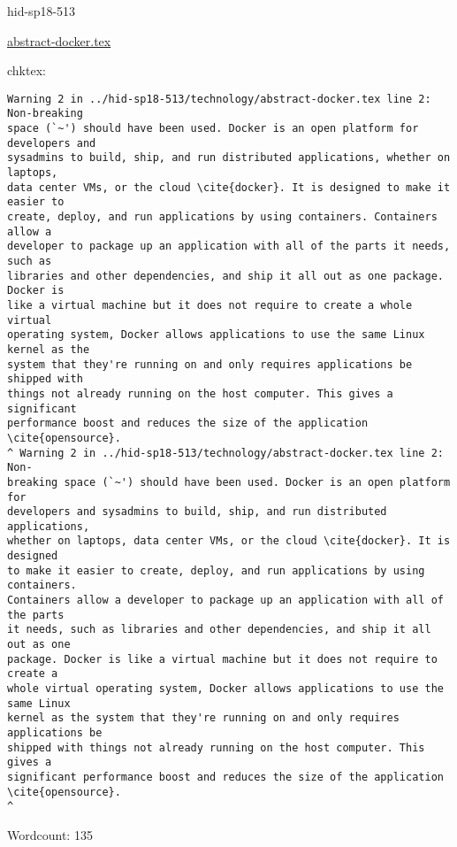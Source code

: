 

\begin{IU}

hid-sp18-513

\href{https://github.com/cloudmesh-community/hid-sp18-513/blob/master//technology/abstract-docker.tex}{abstract-docker.tex}

 
chktex:
\begin{tiny}
\begin{verbatim}
Warning 2 in ../hid-sp18-513/technology/abstract-docker.tex line 2: Non-breaking
space (`~') should have been used. Docker is an open platform for developers and
sysadmins to build, ship, and run distributed applications, whether on laptops,
data center VMs, or the cloud \cite{docker}. It is designed to make it easier to
create, deploy, and run applications by using containers. Containers allow a
developer to package up an application with all of the parts it needs, such as
libraries and other dependencies, and ship it all out as one package. Docker is
like a virtual machine but it does not require to create a whole virtual
operating system, Docker allows applications to use the same Linux kernel as the
system that they're running on and only requires applications be shipped with
things not already running on the host computer. This gives a significant
performance boost and reduces the size of the application \cite{opensource}.
^ Warning 2 in ../hid-sp18-513/technology/abstract-docker.tex line 2: Non-
breaking space (`~') should have been used. Docker is an open platform for
developers and sysadmins to build, ship, and run distributed applications,
whether on laptops, data center VMs, or the cloud \cite{docker}. It is designed
to make it easier to create, deploy, and run applications by using containers.
Containers allow a developer to package up an application with all of the parts
it needs, such as libraries and other dependencies, and ship it all out as one
package. Docker is like a virtual machine but it does not require to create a
whole virtual operating system, Docker allows applications to use the same Linux
kernel as the system that they're running on and only requires applications be
shipped with things not already running on the host computer. This gives a
significant performance boost and reduces the size of the application
\cite{opensource}.
^
\end{verbatim}
\end{tiny}

Wordcount: 135

\end{IU}

